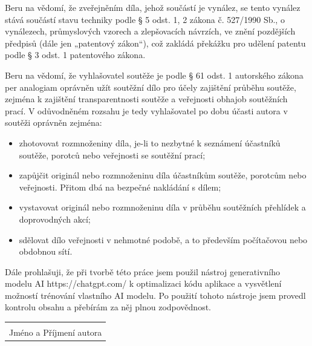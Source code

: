 \documentclass[12pt, a4paper,
]{report}
\let\cleardoublepage\clearpage
\begin{document}
Beru na vědomí, že zveřejněním díla, jehož součástí je vynález, se tento vynález stává součástí stavu techniky podle § 5 odst. 1, 2 zákona č. 527/1990 Sb., o vynálezech, průmyslových vzorech a zlepšovacích návrzích, ve znění pozdějších předpisů (dále jen „patentový zákon“), což zakládá překážku pro udělení patentu podle § 3 odst. 1 patentového zákona.

Beru na vědomí, že vyhlašovatel soutěže je podle § 61 odst. 1 autorského zákona per analogiam oprávněn užít soutěžní dílo pro účely zajištění průběhu soutěže, zejména k zajištění transparentnosti soutěže a veřejnosti obhajob soutěžních prací. V odůvodněném rozsahu je tedy vyhlašovatel po dobu účasti autora v soutěži oprávněn zejména:
\begin{itemize}
\item zhotovovat rozmnoženiny díla, je-li to nezbytné k seznámení účastníků soutěže, porotců nebo veřejnosti se soutěžní prací;
\item zapůjčit originál nebo rozmnoženinu díla účastníkům soutěže, porotcům nebo veřejnosti. Přitom dbá na bezpečné nakládání s dílem;
\item vystavovat originál nebo rozmnoženinu díla v průběhu soutěžních přehlídek a doprovodných akcí;
\item sdělovat dílo veřejnosti v nehmotné podobě, a to především počítačovou nebo obdobnou sítí.
\end{itemize}

Dále prohlašuji, že při tvorbě této práce jsem použil nástroj generativního modelu AI https://chatgpt.com/ k optimalizaci kódu aplikace a vysvětlení možností trénování vlastního AI modelu. Po použití tohoto nástroje jsem provedl kontrolu obsahu a přebírám za něj plnou zodpovědnost.


\vfill
{}
\noindent
\begin{minipage}{\linewidth}
  \hspace{9.5cm}
  \begin{tabular}{@{}p{6cm}@{}}
    \dotfill \\
    Jméno a Příjmení autora
  \end{tabular}
\end{minipage}

\cleardoublepage

\end{document}
